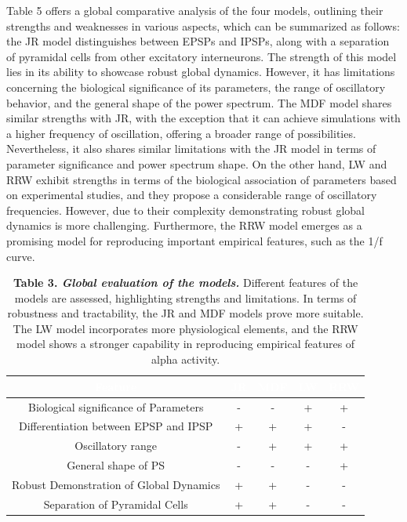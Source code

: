\documentclass[12pt,twoside]{article}
\begin{document}
Table 5 offers a global comparative analysis of the four models, outlining their strengths and weaknesses in various aspects, which can be summarized as follows: the JR model distinguishes between EPSPs and IPSPs, along with a separation of pyramidal cells from other excitatory interneurons. The strength of this model lies in its ability to showcase robust global dynamics. However, it has limitations concerning the biological significance of its parameters, the range of oscillatory behavior, and the general shape of the power spectrum. The MDF model shares similar strengths with JR, with the exception that it can achieve simulations with a higher frequency of oscillation, offering a broader range of possibilities. Nevertheless, it also shares similar limitations with the JR model in terms of parameter significance and power spectrum shape. On the other hand, LW and RRW exhibit strengths in terms of the biological association of parameters based on experimental studies, and they propose a considerable range of oscillatory frequencies. However, due to their complexity demonstrating robust global dynamics is more challenging. Furthermore, the RRW model emerges as a promising model for reproducing important empirical features, such as the 1/f curve.



\begin{table}[]
    \centering
    \begin{tabular}{ccccc}
        \rowcolor{black} 
        \textcolor{white}{Feature} & \textcolor{white}{JR} & \textcolor{white}{MDF} & \textcolor{white}{LW} & \textcolor{white}{RRW} \\
        \hline
        Biological significance of Parameters & - & - & + & + \\
        Differentiation between EPSP and IPSP & + & + & + & - \\
        Oscillatory range & - & + & + & + \\
        General shape of PS & - & - & - & + \\
        Robust Demonstration of Global Dynamics & + & + & - & - \\
        Separation of Pyramidal Cells & + & + & - & -
    \end{tabular}
    \caption*{\textbf{Table 3. \textit{Global evaluation of the models.}} Different features of the models are assessed, highlighting strengths and limitations. In terms of robustness and tractability, the JR and MDF models prove more suitable. The LW model incorporates more physiological elements, and the RRW model shows a stronger capability in reproducing empirical features of alpha activity.} 
    \label{tab:global_eval}
\end{table}
\end{document}
